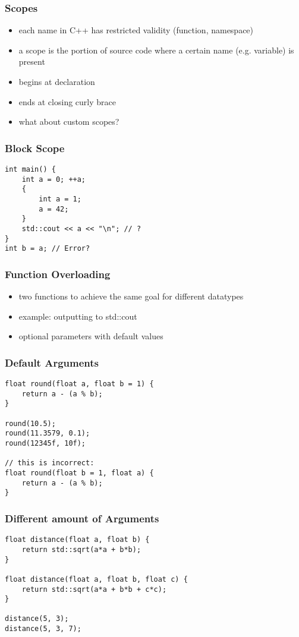 \begin{frame}[fragile]
    \frametitle{Scopes}
    \begin{itemize}
        \item each name in C++ has restricted validity (function, namespace)
        \item a scope is the portion of source code where a certain name (e.g. variable) is present
        \item begins at declaration
        \item ends at closing curly brace
        \item what about custom scopes?
    \end{itemize}
\end{frame}

\begin{frame}[fragile]
    \frametitle{Block Scope}
    \begin{lstlisting}
int main() {
    int a = 0; ++a;
    {
        int a = 1;
        a = 42;
    }
    std::cout << a << "\n"; // ?
}
int b = a; // Error?
    \end{lstlisting}
\end{frame}

\begin{frame}[fragile]
    \frametitle{Function Overloading}
    \begin{itemize}
        \item two functions to achieve the same goal for different datatypes
        \item example: outputting to std::cout
        \item optional parameters with default values
    \end{itemize}
\end{frame}

\begin{frame}[fragile]
    \frametitle{Default Arguments}
    \begin{lstlisting}
float round(float a, float b = 1) {
    return a - (a % b);
}

round(10.5);
round(11.3579, 0.1);
round(12345f, 10f);

// this is incorrect:
float round(float b = 1, float a) {
    return a - (a % b);
}
    \end{lstlisting}
\end{frame}

\begin{frame}[fragile]
    \frametitle{Different amount of Arguments}
    \begin{lstlisting}
float distance(float a, float b) {
    return std::sqrt(a*a + b*b);
}

float distance(float a, float b, float c) {
    return std::sqrt(a*a + b*b + c*c);
}

distance(5, 3);
distance(5, 3, 7);
    \end{lstlisting}
\end{frame}

